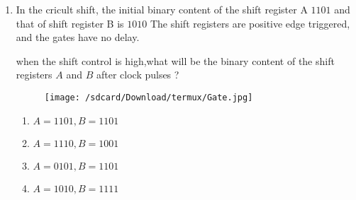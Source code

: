 \documentclass[20pt,-letter paper]{article}
\title{}
\date{\today}
\begin{document}

\begin{enumerate}

\item In the cricult shift, the initial binary content of the shift register A $1101$ and that of shift register B is $1010$ The shift registers are positive edge triggered, and the gates have no delay.

when the shift control is high,what will be the binary content of the shift registers $A$ and $B$ after clock pulses ?


\begin {figure}[h]
 \centering
 \texttt{[image: /sdcard/Download/termux/Gate.jpg]}
\end{figure}

\begin{enumerate}
\item $A= 1101,B=1101$
\item $A=1110 ,B=1001$
\item $A=0101 ,B=1101$
\item $A=1010 ,B=1111$
\end {enumerate}
\end {enumerate}
\end{document}
